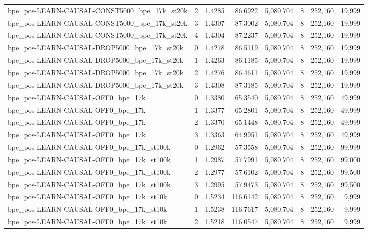\begin{tabular}{lrrrrrrr}
bpe\_pos-LEARN-CAUSAL-CONST5000\_bpe\_17k\_st20k & 2 & 1.4285 & 86.6922 & 5,080,704 & 8 & 252,160 & 19,999 \\
bpe\_pos-LEARN-CAUSAL-CONST5000\_bpe\_17k\_st20k & 3 & 1.4307 & 87.3002 & 5,080,704 & 8 & 252,160 & 19,999 \\
bpe\_pos-LEARN-CAUSAL-CONST5000\_bpe\_17k\_st20k & 4 & 1.4304 & 87.2237 & 5,080,704 & 8 & 252,160 & 19,999 \\
bpe\_pos-LEARN-CAUSAL-DROP5000\_bpe\_17k\_st20k & 0 & 1.4278 & 86.5119 & 5,080,704 & 8 & 252,160 & 19,999 \\
bpe\_pos-LEARN-CAUSAL-DROP5000\_bpe\_17k\_st20k & 1 & 1.4263 & 86.1185 & 5,080,704 & 8 & 252,160 & 19,999 \\
bpe\_pos-LEARN-CAUSAL-DROP5000\_bpe\_17k\_st20k & 2 & 1.4276 & 86.4611 & 5,080,704 & 8 & 252,160 & 19,999 \\
bpe\_pos-LEARN-CAUSAL-DROP5000\_bpe\_17k\_st20k & 3 & 1.4308 & 87.3185 & 5,080,704 & 8 & 252,160 & 19,999 \\
bpe\_pos-LEARN-CAUSAL-OFF0\_bpe\_17k & 0 & 1.3380 & 65.3540 & 5,080,704 & 8 & 252,160 & 49,999 \\
bpe\_pos-LEARN-CAUSAL-OFF0\_bpe\_17k & 1 & 1.3377 & 65.2801 & 5,080,704 & 8 & 252,160 & 49,999 \\
bpe\_pos-LEARN-CAUSAL-OFF0\_bpe\_17k & 2 & 1.3370 & 65.1448 & 5,080,704 & 8 & 252,160 & 49,999 \\
bpe\_pos-LEARN-CAUSAL-OFF0\_bpe\_17k & 3 & 1.3363 & 64.9951 & 5,080,704 & 8 & 252,160 & 49,999 \\
bpe\_pos-LEARN-CAUSAL-OFF0\_bpe\_17k\_st100k & 0 & 1.2962 & 57.3558 & 5,080,704 & 8 & 252,160 & 99,999 \\
bpe\_pos-LEARN-CAUSAL-OFF0\_bpe\_17k\_st100k & 1 & 1.2987 & 57.7991 & 5,080,704 & 8 & 252,160 & 99,000 \\
bpe\_pos-LEARN-CAUSAL-OFF0\_bpe\_17k\_st100k & 2 & 1.2977 & 57.6102 & 5,080,704 & 8 & 252,160 & 99,500 \\
bpe\_pos-LEARN-CAUSAL-OFF0\_bpe\_17k\_st100k & 3 & 1.2995 & 57.9473 & 5,080,704 & 8 & 252,160 & 99,500 \\
bpe\_pos-LEARN-CAUSAL-OFF0\_bpe\_17k\_st10k & 0 & 1.5234 & 116.6142 & 5,080,704 & 8 & 252,160 & 9,999 \\
bpe\_pos-LEARN-CAUSAL-OFF0\_bpe\_17k\_st10k & 1 & 1.5238 & 116.7617 & 5,080,704 & 8 & 252,160 & 9,999 \\
bpe\_pos-LEARN-CAUSAL-OFF0\_bpe\_17k\_st10k & 2 & 1.5218 & 116.0547 & 5,080,704 & 8 & 252,160 & 9,999 \\

\end{tabular}
